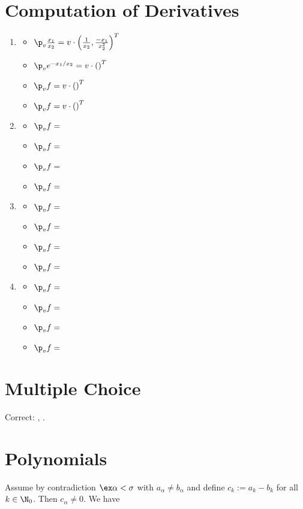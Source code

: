 \documentclass{article}
\begin{document}
\section{Computation of Derivatives}
\begin{enumerate}
    \item \begin{itemize}
        \item $\p_v \frac{x_1}{x_2} = v \cdot \left(\frac{1}{x_2}, \frac{-x_1}{x_2^2} \right)^T$
        \item $\p_v e^{-x_1 / x_2} = v \cdot \left( \right)^T$
        \item $\p_v f = v \cdot \left( \right)^T$
        \item $\p_v f = v \cdot \left( \right)^T$
    \end{itemize}
    \item \begin{itemize}
        \item $\p_v f = $
        \item $\p_v f = $
        \item $\p_v f = $
        \item $\p_v f = $
    \end{itemize}
    \item \begin{itemize}
        \item $\p_v f = $
        \item $\p_v f = $
        \item $\p_v f = $
        \item $\p_v f = $
    \end{itemize}
    \item \begin{itemize}
        \item $\p_v f = $
        \item $\p_v f = $
        \item $\p_v f = $
        \item $\p_v f = $
    \end{itemize}
\end{enumerate}

\section{Multiple Choice}
Correct: , . 

\section{Polynomials}
Assume by contradiction $\ex \alpha < \sigma$ with $a_{\alpha} \neq b_{\alpha}$ and define $c_k := a_k - b_k$ for all $k \in \N_0$. Then $c_{\alpha} \neq 0$. We have 
\end{document}
